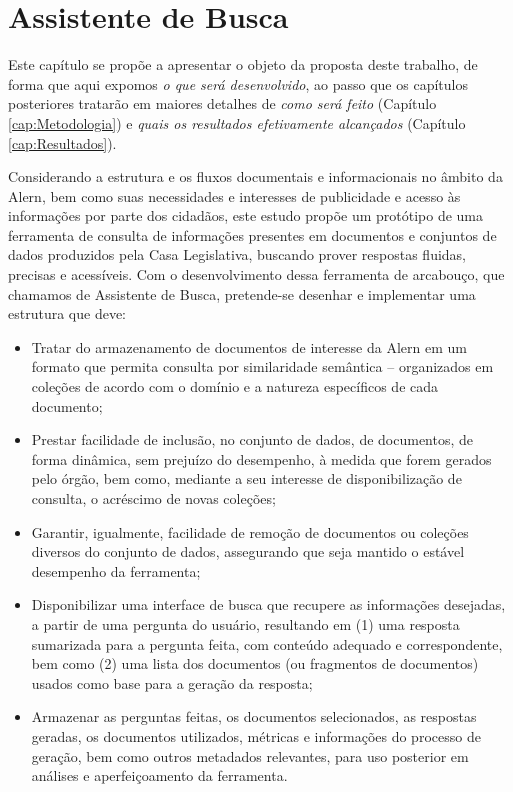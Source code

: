 \chapter{Assistente de Busca}
\label{cap:Assistente}

Este capítulo se propõe a apresentar o objeto da proposta deste trabalho, de forma que aqui expomos \textit{o que será desenvolvido}, ao passo que os capítulos posteriores tratarão em maiores detalhes de \textit{como será feito} (Capítulo \ref{cap:Metodologia}) e \textit{quais os resultados efetivamente alcançados} (Capítulo \ref{cap:Resultados}).

Considerando a estrutura e os fluxos documentais e informacionais no âmbito da \ac{Alern}, bem como suas necessidades e interesses de publicidade e acesso às informações por parte dos cidadãos, este estudo propõe um protótipo de uma ferramenta de consulta de informações presentes em documentos e conjuntos de dados produzidos pela Casa Legislativa, buscando prover respostas fluidas, precisas e acessíveis. Com o desenvolvimento dessa ferramenta de arcabouço, que chamamos de Assistente de Busca, pretende-se desenhar e implementar uma estrutura que deve:

\begin{itemize}
    \item Tratar do armazenamento de documentos de interesse da \ac{Alern} em um formato que permita consulta por similaridade semântica -- organizados em coleções de acordo com o domínio e a natureza específicos de cada documento;

    \item Prestar facilidade de inclusão, no conjunto de dados, de documentos, de forma dinâmica, sem prejuízo do desempenho, à medida que forem gerados pelo órgão, bem como, mediante a seu interesse de disponibilização de consulta, o acréscimo de novas coleções;

    \item Garantir, igualmente, facilidade de remoção de documentos ou coleções diversos do conjunto de dados, assegurando que seja mantido o estável desempenho da ferramenta; 

    \item Disponibilizar uma interface de busca que recupere as informações desejadas, a partir de uma pergunta do usuário, resultando em (1) uma resposta sumarizada para a pergunta feita, com conteúdo adequado e correspondente, bem como (2) uma lista dos documentos (ou fragmentos de documentos) usados como base para a geração da resposta; 

    \item Armazenar as perguntas feitas, os documentos selecionados, as respostas geradas, os documentos utilizados, métricas e informações do processo de geração, bem como outros metadados relevantes, para uso posterior em análises e aperfeiçoamento da ferramenta.
\end{itemize}

